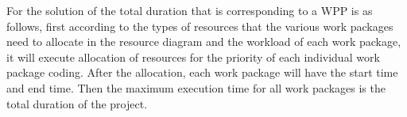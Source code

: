 For the solution of the total duration that is corresponding to a WPP
is as follows, first according to the types of resources that the
various work packages need to allocate in the resource diagram and the
workload of each work package, it will execute allocation of resources
for the priority of each individual work package coding. After the
allocation, each work package will have the start time and end
time. Then the maximum execution time for all work packages is the
total duration of the project.

